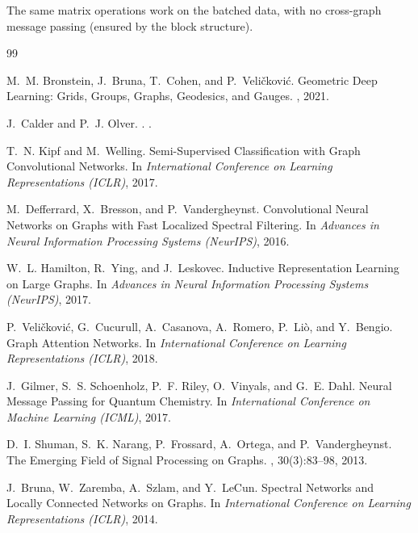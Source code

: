 \begin{notechapter}
The same matrix operations work on the batched data, with no 
cross-graph message passing (ensured by the block structure).

\newpage
\begin{thebibliography}{99}

M.~M. Bronstein, J.~Bruna, T.~Cohen, and P.~Veličković.
\newblock Geometric Deep Learning: Grids, Groups, Graphs, Geodesics, and Gauges.
, 2021.

J.~Calder and P.~J. Olver.
.
.

T.~N. Kipf and M.~Welling.
\newblock Semi-Supervised Classification with Graph Convolutional Networks.
\newblock In {\em International Conference on Learning Representations (ICLR)}, 2017.

M.~Defferrard, X.~Bresson, and P.~Vandergheynst.
\newblock Convolutional Neural Networks on Graphs with Fast Localized Spectral Filtering.
\newblock In {\em Advances in Neural Information Processing Systems (NeurIPS)}, 2016.

W.~L. Hamilton, R.~Ying, and J.~Leskovec.
\newblock Inductive Representation Learning on Large Graphs.
\newblock In {\em Advances in Neural Information Processing Systems (NeurIPS)}, 2017.

P.~Veličković, G.~Cucurull, A.~Casanova, A.~Romero, P.~Liò, and Y.~Bengio.
\newblock Graph Attention Networks.
\newblock In {\em International Conference on Learning Representations (ICLR)}, 2018.

J.~Gilmer, S.~S. Schoenholz, P.~F. Riley, O.~Vinyals, and G.~E. Dahl.
\newblock Neural Message Passing for Quantum Chemistry.
\newblock In {\em International Conference on Machine Learning (ICML)}, 2017.

D.~I. Shuman, S.~K. Narang, P.~Frossard, A.~Ortega, and P.~Vandergheynst.
\newblock The Emerging Field of Signal Processing on Graphs.
, 30(3):83--98, 2013.

J.~Bruna, W.~Zaremba, A.~Szlam, and Y.~LeCun.
\newblock Spectral Networks and Locally Connected Networks on Graphs.
\newblock In {\em International Conference on Learning Representations (ICLR)}, 2014.


\end{thebibliography}
\end{notechapter}
